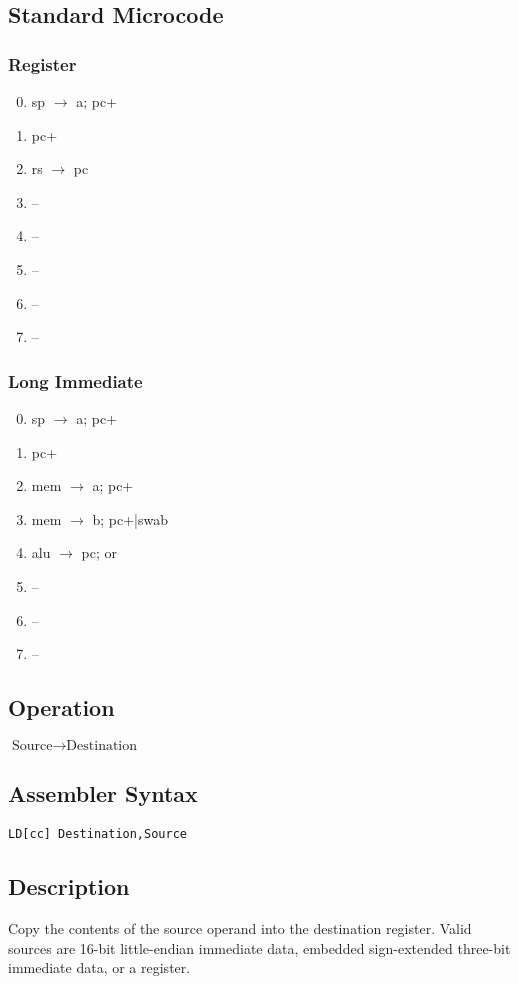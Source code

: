 \documentclass[11pt]{book}
\newcommand*{\instruction}[2][]{%
  \clearpage
  \thispagestyle{fancy}%
  \fancyhf[HL,HR]{\huge{#2}}%
  \fancyhf[HC]{#1}\addtocounter{section}{1}\noindent
}
\begin{document}
\subsection*{Standard Microcode}
\begin{multicols}{2}\ttfamily\selectfont\small
  \subsubsection*{Register}
  \begin{enumerate}\setcounter{enumi}{-1}
  \item sp \(\rightarrow\) a; pc+
  \item pc+
  \item rs \(\rightarrow\) pc
  \item --
  \item --
  \item --
  \item --
  \item --
  \end{enumerate}
  \columnbreak
  \subsubsection*{Long Immediate}
  \begin{enumerate}\setcounter{enumi}{-1}
  \item sp \(\rightarrow\) a; pc+
  \item pc+
  \item mem \(\rightarrow\) a; pc+
  \item mem \(\rightarrow\) b; pc+|swab
  \item alu \(\rightarrow\) pc; or
  \item --
  \item --
  \item --
  \end{enumerate}
\end{multicols}


\instruction[Load]{LD}
\subsection*{Operation}
\(\text{Source}\rightarrow\text{Destination}\)

\subsection*{Assembler Syntax}
\texttt{LD[cc] Destination,Source}

\subsection*{Description}
Copy the contents of the source operand into the destination register.
Valid sources are 16-bit little-endian immediate data,
embedded sign-extended three-bit immediate data,
or a register.
\end{document}
